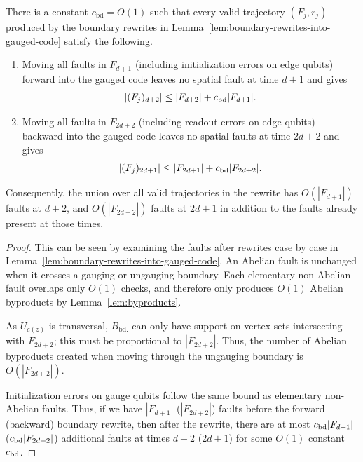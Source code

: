 \documentclass[11pt]{article}
\begin{document}
\begin{corollary}
\label{cor:boundary-rewrite-fault-support}
    There is a constant $c_{\mathrm{bd}}=O(1)$ such that every valid trajectory $(F_j,r_j)$ produced by the boundary rewrites in Lemma~\ref{lem:boundary-rewrites-into-gauged-code} satisfy the following.
    \begin{enumerate}
        \item Moving all faults in $F_{d+1}$ (including initialization errors on edge qubits) forward into the gauged code leaves no spatial fault at time $d+1$ and gives 
            \begin{equation}
                |(F_j)_{d+2}| \le |F_{d+2}|+ c_{\rm{bd}} |F_{d+1}|.
            \end{equation}
        \item Moving all faults in $F_{2d+2}$ (including readout errors on edge qubits) backward into the gauged code leaves no spatial faults at time $2d+2$ and gives 
        \begin{equation}
            |(F_j)_{2d+1}|\le |F_{2d+1}| + c_{\rm{bd}} |F_{2d+2}|.
        \end{equation}
    \end{enumerate}
    Consequently, the union over all valid trajectories in the rewrite has  $O(|F_{d+1}|)$ faults at $d+2$, and $O(|F_{2d+2}|)$ faults at $2d+1$ in addition to the faults already present at those times.
\end{corollary}
\begin{proof}
    This can be seen by examining the faults after rewrites case by case in Lemma~\ref{lem:boundary-rewrites-into-gauged-code}. An Abelian fault is unchanged when it crosses a gauging or ungauging boundary. Each elementary non-Abelian fault overlaps only $O(1)$ checks, and therefore only produces $O(1)$ Abelian byproducts by Lemma~\ref{lem:byproducts}.  
    
    As $U_{c(z)}$ is transversal, $B_{\mathrm{bd.}}$ can only have support on vertex sets intersecting with $F_{2d+2}$; this must be proportional to $|F_{2d+2}|$. Thus, the number of Abelian byproducts created when moving through the ungauging boundary is $O(|F_{2d+2}|)$. 
    
    Initialization errors on gauge qubits follow the same bound as elementary non-Abelian faults.
    Thus, if we have $|F_{d+1}|$ ($|F_{2d+2}|$) faults before the forward (backward) boundary rewrite, then after the rewrite, there are at most $c_{\rm{bd}}|F_{d+1}|$ ($c_{\rm{bd}}|F_{2d+2}|$) additional faults at times $d+2$ ($2d+1$) for some $O(1)$ constant $c_{\rm bd}$.
\end{proof}
\end{document}
